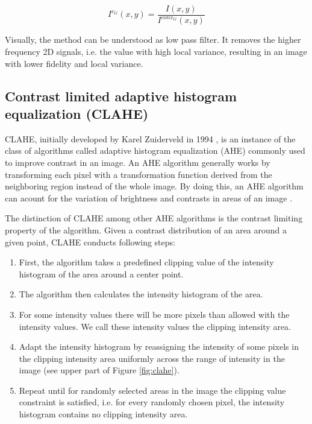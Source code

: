 \documentclass[pdftex,12pt,a4paper]{report}
\begin{document}
\begin{equation}
I^{c_G}(x, y) = \frac{I(x, y)}{I^{conv_G}(x, y)} 
\label{equation:gauss_blur_correction}
\end{equation}

Visually, the method can be understood as low pass filter. It removes the higher frequency 2D signals, i.e. the value with high local variance, resulting in an image with lower fidelity and local variance.

\subsection{Contrast limited adaptive histogram equalization (CLAHE)}
\label{subsection:clahe}

CLAHE, initially developed by Karel Zuiderveld in 1994 \cite{zuiderveld1994contrast}, is an instance of the class of algorithms called adaptive histogram equalization (AHE) commonly used to improve contrast in an image. An AHE algorithm generally works by transforming each pixel with a transformation function derived from the neighboring region instead of the whole image.  By doing this, an AHE algorithm can acount for the variation of brightness and contrasts in areas of an image \cite{pizer1987adaptive}.

The distinction of CLAHE among other AHE algorithms is the contrast limiting property of the algorithm. Given a contrast distribution of an area around a given point, CLAHE conducts following steps:

\begin{enumerate}
\item First, the algorithm takes a predefined clipping value of the intensity histogram of the area around a center point.
\item The algorithm then calculates the intensity histogram of the area.
\item For some intensity values there will be more pixels than allowed with the intensity values. We call these intensity values the clipping intensity area.
\item Adapt the intensity histogram by reassigning the intensity of some pixels in the clipping intensity area uniformly across the range of intensity in the image (see upper part of Figure \ref{fig:clahe}).
\item Repeat until for randomly selected areas in the image the clipping value constraint is satisfied, i.e. for every randomly chosen pixel, the intensity histogram contains no clipping intensity area.
\end{enumerate}
\end{document}

